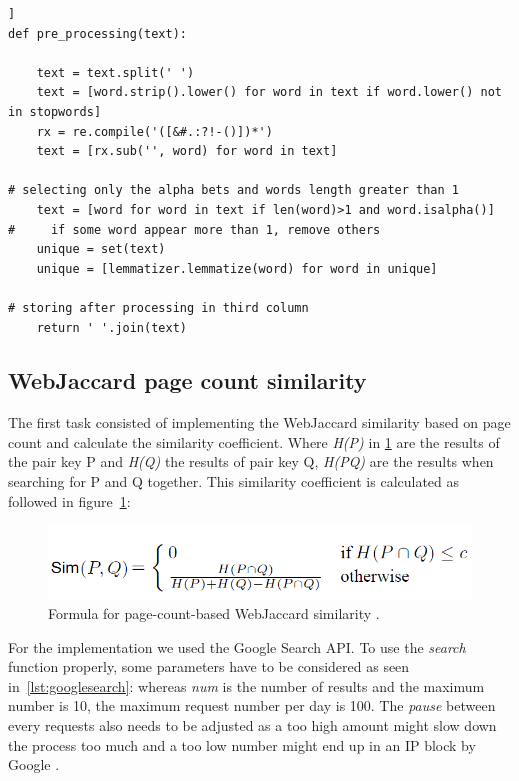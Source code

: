 \documentclass[conference]{IEEEtran}
\begin{document}
\begin{lstlisting}[frame=single, label=lst:preproc, caption={Pre-processing for synsets of word length>1}, captionpos=b]]
def pre_processing(text):

    text = text.split(' ')
    text = [word.strip().lower() for word in text if word.lower() not in stopwords]
    rx = re.compile('([&#.:?!-()])*')
    text = [rx.sub('', word) for word in text]
    
# selecting only the alpha bets and words length greater than 1
    text = [word for word in text if len(word)>1 and word.isalpha()]
#     if some word appear more than 1, remove others
    unique = set(text)
    unique = [lemmatizer.lemmatize(word) for word in unique]
    
# storing after processing in third column
    return ' '.join(text)
\end{lstlisting}

\subsection{WebJaccard page count similarity}\label{subsec:webjac}

The first task consisted of implementing the WebJaccard similarity based on page count and calculate the similarity coefficient. Where \textit{H(P)} in \ref{fig:pagecount} are the results of the pair key P and \textit{H(Q)} the results of pair key Q, \textit{H(PQ)} are the results when searching for P and Q together. This similarity coefficient  is calculated as followed in figure~\ref{fig:pagecount}:

\begin{figure}[h]
\centerline{\includegraphics[scale=0.6]{img/pagecount.png}}
\caption{Formula for page-count-based WebJaccard similarity \cite{websim}.}
\label{fig:pagecount}
\end{figure}

For the implementation we used the Google Search API. To use the \textit{search} function properly, some parameters have to be considered as seen in~\ref{lst:googlesearch}: whereas \textit{num} is the number of results and the maximum number is 10, the maximum request number per day is 100. The \textit{pause} between every requests also needs to be adjusted as a too high amount might slow down the process too much and a too low number might end up in an IP block by Google \cite{search}.
\end{document}
